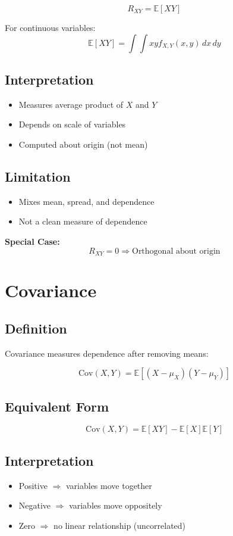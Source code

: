\documentclass[11pt]{article}
\begin{document}
\[
R_{XY} = \mathbb{E}[XY]
\]

For continuous variables:
\[
\mathbb{E}[XY] = \int\int xy f_{X,Y}(x,y)\,dx\,dy
\]

\subsection{Interpretation}
\begin{itemize}
    \item Measures average product of $X$ and $Y$
    \item Depends on scale of variables
    \item Computed about origin (not mean)
\end{itemize}

\subsection{Limitation}
\begin{itemize}
    \item Mixes mean, spread, and dependence
    \item Not a clean measure of dependence
\end{itemize}

\textbf{Special Case:}
\[
R_{XY} = 0 \Rightarrow \text{Orthogonal about origin}
\]

\section{Covariance}

\subsection{Definition}
Covariance measures dependence after removing means:

\[
\text{Cov}(X,Y) = \mathbb{E}[(X - \mu_X)(Y - \mu_Y)]
\]

\subsection{Equivalent Form}
\[
\text{Cov}(X,Y) = \mathbb{E}[XY] - \mathbb{E}[X]\mathbb{E}[Y]
\]

\subsection{Interpretation}
\begin{itemize}
    \item Positive $\Rightarrow$ variables move together
    \item Negative $\Rightarrow$ variables move oppositely
    \item Zero $\Rightarrow$ no linear relationship (uncorrelated)
\end{itemize}
\end{document}
